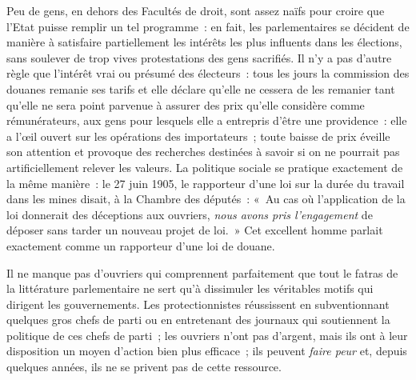 \documentclass[french,twoside]{book} %
\begin{document}
Peu de gens, en dehors des Facultés de droit, sont assez naïfs pour croire que l’Etat puisse remplir un tel programme : en fait, les parlementaires se décident de manière à satisfaire partiellement les intérêts les plus influents dans les élections, sans soulever de trop vives protestations des gens sacrifiés. Il n’y a pas d’autre règle que l’intérêt vrai ou présumé des électeurs : tous les jours la commission des douanes remanie ses tarifs et elle déclare qu’elle ne cessera de les remanier tant qu’elle ne sera point parvenue à assurer des prix qu’elle considère comme rémunérateurs, aux gens pour lesquels elle a entrepris d’être une providence : elle a l’œil ouvert sur les opérations des importateurs ; toute baisse de prix éveille son attention et provoque des recherches destinées  à savoir si on ne pourrait pas artificiellement relever les valeurs. La politique sociale se pratique exactement de la même manière : le 27 juin 1905, le rapporteur d’une loi sur la durée du travail dans les mines disait, à la Chambre des députés : « Au cas où l’application de la loi donnerait des déceptions aux ouvriers, \emph{nous avons pris l’engagement} de déposer sans tarder un nouveau projet de loi. » Cet excellent homme parlait exactement comme un rapporteur d’une loi de douane.\par
Il ne manque pas d’ouvriers qui comprennent parfaitement que tout le fatras de la littérature parlementaire ne sert qu’à dissimuler les véritables motifs qui dirigent les gouvernements. Les protectionnistes réussissent en subventionnant quelques gros chefs de parti ou en entretenant des journaux qui soutiennent la politique de ces chefs de parti ; les ouvriers n’ont pas d’argent, mais ils ont à leur disposition un moyen d’action bien plus efficace ; ils peuvent \emph{faire peur} et, depuis quelques années, ils ne se privent pas de cette ressource.\par
\end{document}
